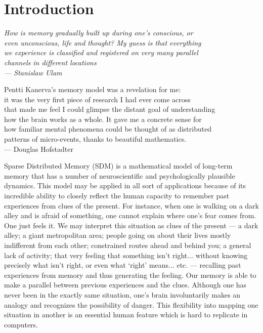 
\chapter{Introduction}

\bigskip

\begin{flushright}{\slshape
    {How is memory gradually built up during one's conscious, or\\
    even unconscious, life and thought?  My guess is that everything \\
    we experience is classified and registered on very many parallel \\
    channels in different locations} \\ \medskip
    --- Stanislaw Ulam}

    \bigskip
    \bigskip
    {Pentti Kanerva's memory model was a revelation for me: \\
it was the very first piece of research I had ever come across\\
that made me feel I could glimpse the distant goal of understanding \\
how the brain works as a whole. It gave me a concrete sense for\\
how familiar mental phenomena could be thought of as distributed\\
patterns of micro-events, thanks to beautiful mathematics.} \\ \medskip
--- Douglas Hofstadter


\end{flushright}
\bigskip
\bigskip




Sparse Distributed Memory (SDM) \citep{Kanerva1988} is a mathematical model of long-term memory that has a number of neuroscientific and psychologically plausible dynamics. This model may be applied in all sort of applications because of its incredible ability to closely reflect the human capacity to remember past experiences from clues of the present. For instance, when one is walking on a dark alley and is afraid of something, one cannot explain where one's fear comes from. One just feels it. We may interpret this situation as clues of the present --- a dark alley; a giant metropolitan area; people going on about their lives mostly indifferent from each other; constrained routes ahead and behind you; a general lack of activity; that very feeling that something isn't right... without knowing precisely what isn't right, or even what `right' means... etc. --- recalling past experiences from memory and thus generating the feeling. Our memory is able to make a parallel between previous experiences and the clues. Although one has never been in the exactly same situation, one's brain involuntarily makes an analogy and recognizes the possibility of danger. This flexibility into mapping one situation in another is an essential human feature which is hard to replicate in computers.

